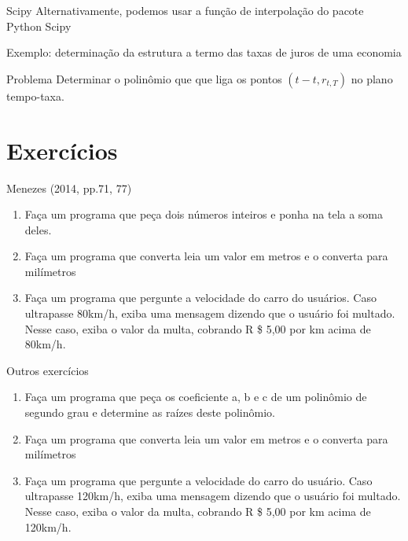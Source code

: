 \documentclass{beamer}
\begin{document}
	\begin{frame}{Scipy}
		Alternativamente, podemos usar a função de interpolação do pacote Python Scipy
	\end{frame}
	
	\begin{frame}{Exemplo: determinação da estrutura a termo das taxas de juros de uma economia}
		\begin{block}{Problema}
			Determinar o polinômio que que liga os pontos \begin{math}
			(t-t, r_{t,T})
			\end{math} no plano tempo-taxa.
		\end{block}
	\end{frame}
	
	
	
	
	
	
	
	\section{Exercícios}
	
	
	
	\begin{frame}{Menezes (2014, pp.71, 77)}
		\begin{enumerate}
			\item Faça um programa que peça dois números inteiros e ponha na tela a soma deles.
			\item Faça um programa que converta leia um valor em metros e o converta para milímetros
			\item Faça um programa que pergunte a velocidade do carro do usuários.  Caso ultrapasse 80km/h, exiba uma mensagem dizendo que o usuário foi multado.  Nesse caso, exiba o valor da multa, cobrando R \$ 5,00 por km acima de 80km/h.
		\end{enumerate}
	\end{frame}
	
	
	
	
	
	
	\begin{frame}{Outros exercícios}
		\begin{enumerate}
			\item Faça um programa que peça os coeficiente a, b e c de um polinômio de segundo grau e determine as raízes deste polinômio.
			\item Faça um programa que converta leia um valor em metros e o converta para milímetros
			\item Faça um programa que pergunte a velocidade do carro do usuário.  Caso ultrapasse 120km/h, exiba uma mensagem dizendo que o usuário foi multado.  Nesse caso, exiba o valor da multa, cobrando R \$ 5,00 por km acima de 120km/h.
			
		\end{enumerate}
		
	\end{frame}
	
\end{document}
